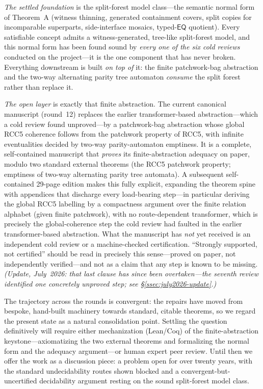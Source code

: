 \documentclass[
]{ceurart}
\theoremstyle{definition}
\newcommand{\EQ}{\ensuremath{\mathsf{EQ}}}
\begin{document}
\emph{The settled foundation} is the split-forest model class---the semantic
normal form of Theorem~A (witness thinning, generated containment covers, split
copies for incomparable superparts, side-interface mosaics, typed-$\EQ$
quotient).  Every satisfiable concept admits a witness-generated, tree-like
split-forest model, and this normal form has been found sound by \emph{every one
of the six cold reviews} conducted on the project---it is the one component that
has never broken.  Everything downstream is built \emph{on top of} it: the finite
patchwork-bag abstraction and the two-way alternating parity tree automaton
\emph{consume} the split forest rather than replace it.

\emph{The open layer} is exactly that finite abstraction.  The current canonical
manuscript (round~12) replaces the earlier transformer-based abstraction---which
a cold review found unproved---by a patchwork-bag abstraction whose global RCC5
coherence follows from the patchwork property of RCC5, with infinite
eventualities decided by two-way parity-automaton emptiness.  It is a complete,
self-contained manuscript that \emph{proves} its finite-abstraction adequacy on
paper, modulo two standard external theorems (the RCC5 patchwork property;
emptiness of two-way alternating parity tree automata).  A subsequent
self-contained 29-page edition makes this fully explicit, expanding the
theorem spine with appendices that discharge every load-bearing step---in
particular deriving the global RCC5 labelling by a compactness argument over the
finite relation alphabet (given finite patchwork), with no route-dependent
transformer, which is precisely the global-coherence step the cold review had
faulted in the earlier transformer-based abstraction.  What the manuscript has
\emph{not} yet received is an independent cold review or a machine-checked
certification.
``Strongly supported, not certified'' should be read in precisely this
sense---proved on paper, not independently verified---and not as a claim that any
step is known to be missing.  \emph{(Update, July~2026: that last clause has
since been overtaken---the seventh review identified one concretely unproved
step; see \S\ref{ssec:july2026-update}.)}

The trajectory across the rounds is convergent: the repairs have moved from
bespoke, hand-built machinery towards standard, citable theorems, so we regard
the present state as a natural consolidation point.  Settling the question
definitively will require either mechanization (Lean/Coq) of the
finite-abstraction keystone---axiomatizing the two external theorems and
formalizing the normal form and the adequacy argument---or human expert peer
review.  Until then we offer the work as a discussion piece: a problem open for
over twenty years, with the standard undecidability routes shown blocked and a
convergent-but-uncertified decidability argument resting on the sound
split-forest model class.
\end{document}
